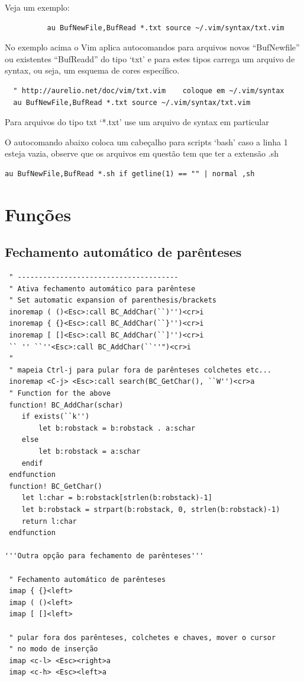 \documentclass[10pt,a4paper,openany]{book}
\begin{document}
Veja um exemplo:

\begin{verbatim}
		  au BufNewFile,BufRead *.txt source ~/.vim/syntax/txt.vim
\end{verbatim}

No exemplo acima o Vim aplica autocomandos para arquivos novos
``BufNewfile'' ou existentes ``BufReadd'' do tipo `txt' e para estes tipos
carrega um arquivo de syntax, ou seja, um esquema de cores específico.

\begin{verbatim}
  " http://aurelio.net/doc/vim/txt.vim    coloque em ~/.vim/syntax
  au BufNewFile,BufRead *.txt source ~/.vim/syntax/txt.vim
\end{verbatim}

Para arquivos do tipo txt `*.txt' use um arquivo de syntax em particular

O autocomando abaixo coloca um cabeçalho para scripts `bash' caso a
linha 1 esteja vazia, observe que os arquivos em questão tem que ter a
extensão .sh

\begin{verbatim}
au BufNewFile,BufRead *.sh if getline(1) == "" | normal ,sh
\end{verbatim}


\section{Funções}
\label{sec:Funções}

\subsection{Fechamento automático de parênteses}
\label{sec:Fechamento automático de parênteses}

\begin{verbatim}
 " --------------------------------------
 " Ativa fechamento automático para parêntese
 " Set automatic expansion of parenthesis/brackets
 inoremap ( ()<Esc>:call BC_AddChar(``)'')<cr>i
 inoremap { {}<Esc>:call BC_AddChar(``}'')<cr>i
 inoremap [ []<Esc>:call BC_AddChar(``]'')<cr>i
 `` '' ``''<Esc>:call BC_AddChar(``''")<cr>i
 "
 " mapeia Ctrl-j para pular fora de parênteses colchetes etc...
 inoremap <C-j> <Esc>:call search(BC_GetChar(), ``W'')<cr>a
 " Function for the above
 function! BC_AddChar(schar)
    if exists(``k'')
        let b:robstack = b:robstack . a:schar
    else
        let b:robstack = a:schar
    endif
 endfunction
 function! BC_GetChar()
    let l:char = b:robstack[strlen(b:robstack)-1]
    let b:robstack = strpart(b:robstack, 0, strlen(b:robstack)-1)
    return l:char
 endfunction

'''Outra opção para fechamento de parênteses'''

 " Fechamento automático de parênteses
 imap { {}<left>
 imap ( ()<left>
 imap [ []<left>

 " pular fora dos parênteses, colchetes e chaves, mover o cursor
 " no modo de inserção
 imap <c-l> <Esc><right>a
 imap <c-h> <Esc><left>a
\end{verbatim}
\end{document}
